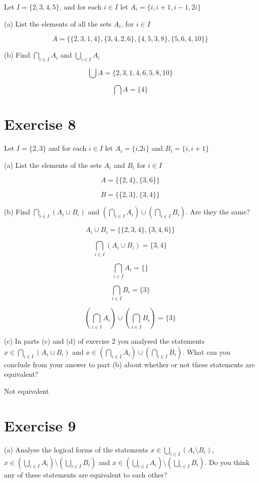 \documentclass[11pt]{article}
\begin{document}
Let $I = \{2, 3, 4, 5\}$, and for each $i \in I$ let $A_i = \{i, i+1, i-1, 2i\}$

\noindent (a) List the elements of all the sets $A_i$, for $i \in I$

$$A = \{ \{2,3,1,4\}, \{3,4,2,6\}, \{4,5,3,8\}, \{5,6,4,10\} \}$$

\noindent (b) Find $\bigcap_{i \in I} A_i$ and $\bigcup_{i \in I} A_i$

$$\bigcup A = \{2,3,1,4,6,5,8,10\}$$

$$\bigcap A = \{4\}$$

\section*{Exercise 8}

Let $I = \{2,3\}$ and for each $i \in I$ let $A_i = \{i. 2i\}$ 
and $B_i = \{i, i+1\}$

\noindent (a) List the elements of the sets $A_i$ and $B_i$ for $i \in I$

$$A = \{ \{2,4\}, \{3,6\} \}$$

$$B = \{ \{2,3\}, \{3,4\} \}$$

\noindent (b) Find $\bigcap_{i \in I} (A_i \cup B_i)$ and 
$(\bigcap_{i \in I} A_i) \cup (\bigcap_{i \in I} B_i)$. Are they the same?

$$A_i \cup B_i = \{\{2,3,4\}, \{3,4,6\}\}$$

$$\bigcap_{i \in I} (A_i \cup B_i) = \{3,4\}$$

$$\bigcap_{i \in I} A_i = \{\}$$

$$\bigcap_{i \in I} B_i = \{3\}$$

$$(\bigcap_{i \in I} A_i) \cup (\bigcap_{i \in I} B_i) = \{3\}$$

\noindent (c) In parts (c) and (d) of exercise 2 you analysed the statements 
$x \in \bigcap_{i \in I} (A_i \cup B_i)$ and 
$x \in (\bigcap_{i \in I} A_i) \cup (\bigcap_{i \in I} B_i)$. What can you 
conclude from your answer to part (b) about whether or not these statements 
are equivalent?

Not equivalent

\section*{Exercise 9} 

\noindent (a) Analyse the logical forms of the statements 
$x \in \bigcup_{i \in I} (A_i \setminus B_i)$, 
$x \in (\bigcup_{i \in I} A_i) \setminus (\bigcup_{i \in I} B_i)$ and 
$x \in (\bigcup_{i \in I} A_i) \setminus (\bigcup_{i \in I} B_i)$. Do you think 
any of these statements are equivalent to each other?
\end{document}

